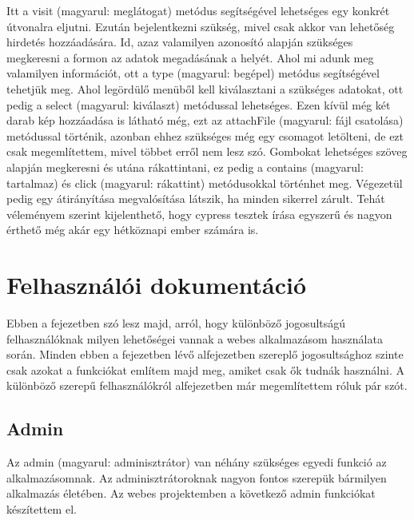 \documentclass[]{thesis-ekf}
\theoremstyle{definition}
\theoremstyle{remark}
\begin{document}
		Itt a visit (magyarul: meglátogat) metódus segítségével lehetséges egy konkrét útvonalra eljutni. Ezután bejelentkezni szükség, mivel csak akkor van lehetőség hirdetés hozzáadására. Id, azaz valamilyen azonosító alapján szükséges megkeresni a formon az adatok megadásának a helyét. Ahol mi adunk meg valamilyen információt, ott a type (magyarul: begépel) metódus segítségével tehetjük meg. Ahol legördülő menüből kell kiválasztani a szükséges adatokat, ott pedig a select (magyarul: kiválaszt) metódussal lehetséges. Ezen kívül még két darab kép hozzáadása is látható még, ezt az attachFile (magyarul: fájl csatolása) metódussal történik, azonban ehhez szükséges még egy csomagot letölteni, de ezt csak megemlítettem, mivel többet erről nem lesz szó. Gombokat lehetséges szöveg alapján megkeresni és utána rákattintani, ez pedig a contains (magyarul: tartalmaz) és click (magyarul: rákattint) metódusokkal történhet meg. Végezetül pedig egy átirányítása megvalósítása látszik, ha minden sikerrel zárult. Tehát véleményem szerint kijelenthető, hogy cypress tesztek írása egyszerű és nagyon érthető még akár egy hétköznapi ember számára is.
		
	\chapter{Felhasználói dokumentáció}
		Ebben a fejezetben szó lesz majd, arról, hogy különböző jogosultságú felhasználóknak milyen lehetőségei vannak a webes alkalmazásom használata során. Minden ebben a fejezetben lévő alfejezetben szereplő jogosultsághoz szinte csak azokat a funkciókat említem majd meg, amiket csak ők tudnák használni. A különböző szerepű felhasználókról \az{\ref{sc-plantuml}} alfejezetben már megemlítettem róluk pár szót.
	\section{Admin}
	Az admin (magyarul: adminisztrátor) van néhány szükséges egyedi funkció az alkalmazásomnak. Az adminisztrátoroknak nagyon fontos szerepük bármilyen alkalmazás életében. Az webes projektemben a következő admin funkciókat készítettem el.
\end{document}
